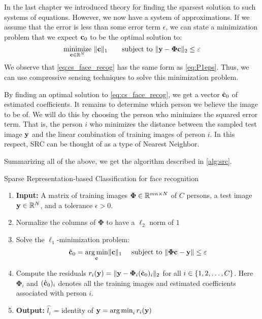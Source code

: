 In the last chapter we introduced theory for finding the sparsest solution to such systems of equations. However, we now have a system of approximations. If we assume that the error is less than some error term $ \epsilon $, we can state a minimization problem that we expect $ \mathbf{c}_{0} $ to be the optimal solution to:
\begin{equation}
	\label{eq:cs_face_recog}
	\underset{\mathbf{c} \in \mathbb{R}^{N}}{\text{minimize}}~ \lVert\mathbf{c}\rVert_{1} \quad\quad\text{subject to}~ \lVert\mathbf{y} - \mathbf{\Phi}\mathbf{c}\rVert_{2} \leq \varepsilon
\end{equation}
We observe that \eqref{eq:cs_face_recog} has the same form as \eqref{eq:P1eps}. Thus, we can use compressive sensing techniques to solve this minimization problem. 

By finding an optimal solution to \eqref{eq:cs_face_recog}, we get a vector $ \hat{\mathbf{c}}_{0} $ of estimated coefficients. It remains to determine which person we believe the image to be of. We will do this by choosing the person who minimizes the squared error term. That is, the person $ i $ who minimizes the distance between the sampled test image $ \mathbf{y} $ and the linear combination of training images of person $ i $. In this respect, SRC can be thought of as a type of Nearest Neighbor. 

Summarizing all of the above, we get the algorithm described in \cref{alg:src}. 



\begin{algorithm}[t]
	\caption{Sparse Representation-based Classification for face recognition}
	\label{alg:src}
	\begin{enumerate}
		\itemsep0em 
		\renewcommand{\parsep}{0pt}
		\renewcommand{\parskip}{0pt}
		\renewcommand{\itemsep}{0pt}
		\item[] \textbf{Input:} A matrix of training images $ \mathbf{\Phi} \in \mathbb{R}^{mn\times N} $ of $ C $ persons, a test image $ \mathbf{y}\in\mathbb{R}^{N} $, and a tolerance $ \epsilon > 0 $.
		\item Normalize the columns of $ \mathbf{\Phi} $ to have a $ \ell_{2} $ norm of $ 1 $
		\item Solve the $ \ell_{1} $-minimization problem:
		\[
			\hat{\mathbf{c}}_{0} = \operatorname*{arg\,min}_{\mathbf{c}} \lVert\mathbf{c}\rVert_{1} ~\quad\text{subject to}~ \lVert\mathbf{\Phi}\mathbf{c} - \mathbf{y}\rVert \leq \varepsilon
		\]
		\item Compute the residuals $ r_{i}(\mathbf{y}) = \lVert\mathbf{y} - \mathbf{\Phi}_{i}(\hat{\mathbf{c}}_{0})_{i}\rVert_{2} $ for all $ i \in \{1, 2, \ldots, C\} $. Here $ \mathbf{\Phi}_{i} $ and $ (\hat{\mathbf{c}}_{0})_{i} $ denotes all the training images and estimated coefficients associated with person $ i $. 
		\item[] \textbf{Output:} $ \hat{l_{i}} $ = identity of $ \mathbf{y} = \operatorname*{arg\,min}_{i} r_{i}(\mathbf{y}) $  
	\end{enumerate}
\end{algorithm}


